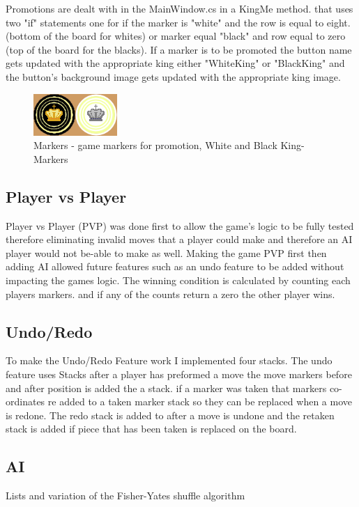 \documentclass[10pt, a4paper]{article}
\begin{document}
Promotions are dealt with in the MainWindow.cs in a KingMe method. that uses two "if" statements one for if the marker is "white" and the row is equal to eight. (bottom of the board for whites) or marker equal "black" and row equal to zero (top of the board for the blacks). If a marker is to be promoted the button name gets updated with the appropriate king either "WhiteKing" or "BlackKing" and the button's background image gets updated with the appropriate king image.
\begin{figure}[H]
  	\centering
  	\includegraphics[scale = 1.25]{KingMarkers}
	\caption{Markers - game markers for promotion, White and Black King-Markers}
  	\label{fig:nonfloat}
	\end{figure} 
	\subsection{Player vs Player}
	Player vs Player (PVP) was done first to allow the game's logic to be fully tested therefore eliminating invalid moves that a player could make and therefore an AI player would not be-able to make as well. Making the game PVP first then adding AI allowed future features such as an undo feature to be added without impacting the games logic.  The winning condition is calculated by counting each players markers. and if any of the counts return a zero the other player wins.
	
	\subsection{Undo/Redo}
	To make the Undo/Redo Feature work I implemented four stacks. The undo feature uses Stacks after a player has preformed a move the move markers before and after position is added the a stack. if a marker was taken that markers co-ordinates re added to a taken marker stack so they can be replaced when a move is redone. The redo stack is added to after a move is undone and the retaken stack is added if piece that has been taken is replaced on the board.
	
	\subsection{AI}
	Lists and variation of the Fisher-Yates shuffle algorithm
	
\end{document}
